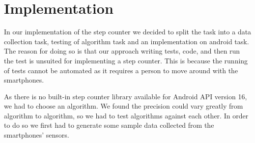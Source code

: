 \section{Implementation}
In our implementation of the step counter we decided to split the task into a data collection task, testing of algorithm task and an implementation on android task. The reason for doing so is that our approach writing tests, code, and then run the test is unsuited for implementing a step counter. This is because the running of tests cannot be automated as it requires a person to move around with the smartphones.

As there is no built-in step counter library available for Android API version 16, we had to choose an algorithm. We found the precision could vary greatly from algorithm to algorithm, so we had to test algorithms against each other. In order to do so we first had to generate some sample data collected from the smartphones' sensors.

